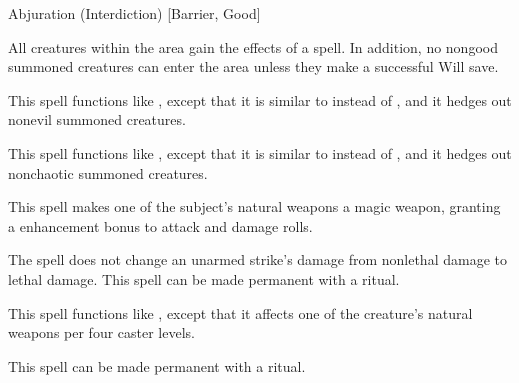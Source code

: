 \par Abjuration (Interdiction) [Barrier, Good]
\begin{spelleffect}
  All creatures within the area gain the effects of a  spell. In addition, no nongood summoned creatures can enter the area unless they make a successful Will save.
\end{spelleffect}

\begin{spelleffect}
  This spell functions like , except that it is similar to  instead of , and it hedges out nonevil summoned creatures.
\end{spelleffect}

\begin{spelleffect}
  This spell functions like , except that it is similar to  instead of , and it hedges out nonchaotic summoned creatures.
\end{spelleffect}

\spellrng{\rngclose}
\spelldur{\durshort}
\begin{spelleffect}
  This spell makes one of the subject's natural weapons a  magic weapon, granting a  enhancement bonus to attack and damage rolls. \bonusscalingdescription
\end{spelleffect}
\begin{spellnotes}
  The spell does not change an unarmed strike's damage from nonlethal damage to lethal damage. This spell can be made permanent with a  ritual.
\end{spellnotes}

\begin{spelleffect}
  This spell functions like , except that it affects one of the creature's natural weapons per four caster levels.
\end{spelleffect}
\begin{spellnotes}
This spell can be made permanent with a  ritual.
\end{spellnotes}

